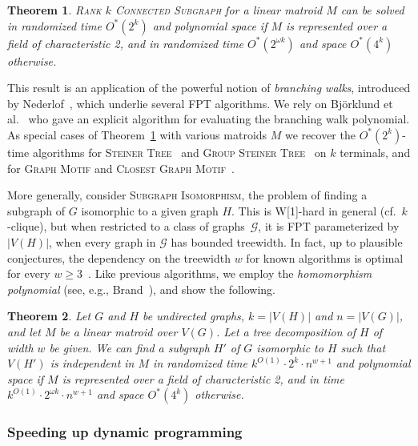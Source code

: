 \documentclass[10pt,a4paper]{article}
\newtheorem{theorem}{Theorem}[section]
\begin{document}
\begin{theorem} \label{ithm:subtree}
  \textsc{Rank $k$ Connected Subgraph} for a linear matroid $M$
  can be solved in randomized time $O^*(2^k)$ and polynomial space
  if $M$ is represented over a field of characteristic 2,
  and in randomized time $O^*(2^{\omega k})$ and space $O^*(4^k)$
  otherwise.
\end{theorem}

This result is an application of the powerful notion of \emph{branching walks},
introduced by Nederlof~\cite{Nederlof13algorithmica}, which underlie several FPT algorithms.
We rely on Björklund et al.~\cite{BjorklundKK16} who gave an explicit algorithm for
evaluating the branching walk polynomial.
As special cases of Theorem~\ref{ithm:subtree} with various matroids $M$
we recover the $O^*(2^k)$-time algorithms for
\textsc{Steiner Tree}~\cite{Nederlof13algorithmica} and
\textsc{Group Steiner Tree}~\cite{MisraPRSS12} on $k$ terminals,
and for \textsc{Graph Motif} and \textsc{Closest Graph Motif}~\cite{BjorklundKK16}.

More generally, consider \textsc{Subgraph Isomorphism}, the problem of finding a subgraph of $G$
isomorphic to a given graph $H$. This is W[1]-hard in general
(cf.~$k$-clique), but when restricted to a class of graphs~$\mathcal{G}$, it is FPT parameterized by $|V(H)|$, when every graph in $\mathcal{G}$ has bounded treewidth. 
In fact, up to plausible conjectures, the dependency on the treewidth $w$ for known algorithms
is optimal for every $w \geq 3$~\cite{BringmannS21}.
Like previous algorithms, we employ the \emph{homomorphism polynomial}
(see, e.g., Brand~\cite{Brand19thesis}), and show the following.

\begin{theorem} \label{ithm:subgraph-iso}
  Let $G$ and $H$ be undirected graphs, $k=|V(H)|$ and $n=|V(G)|$,
  and let $M$ be a linear matroid over $V(G)$. Let a tree decomposition
  of $H$ of width $w$ be given.
  We can find a subgraph $H'$ of $G$ isomorphic to $H$
  such that $V(H')$ is independent in $M$ 
  in randomized time $k^{O(1)} \cdot 2^k \cdot n^{w+1}$ and polynomial space
  if $M$ is represented over a field of characteristic 2,
  and in time $k^{O(1)} \cdot 2^{\omega k} \cdot n^{w+1}$ and space $O^*(4^k)$
  otherwise. 
\end{theorem}


\subsubsection{Speeding up dynamic programming}
\label{sec:intro-noDP}
\end{document}
